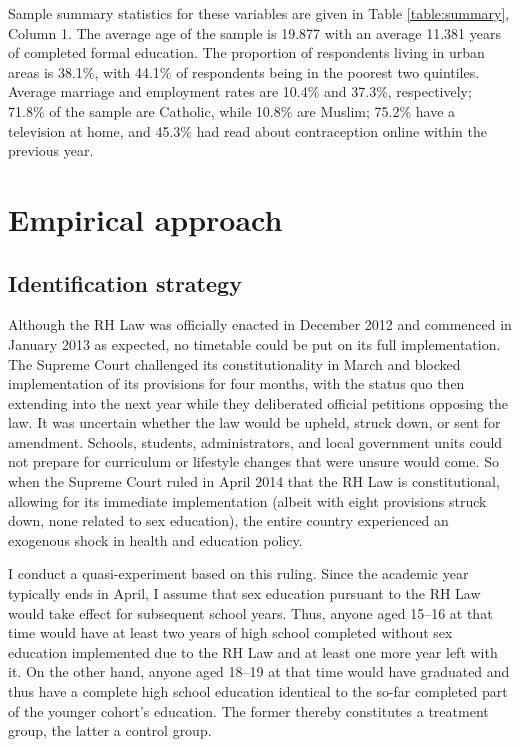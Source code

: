 \documentclass[12pt]{article}
\begin{document}
    Sample summary statistics for these variables are given in Table \ref{table:summary}, Column 1.
    The average age of the sample is 19.877 with an average 11.381 years of completed formal education.
    The proportion of respondents living in urban areas is 38.1\%, with 44.1\% of respondents being in the poorest two quintiles.
    Average marriage and employment rates are 10.4\% and 37.3\%, respectively; 71.8\% of the sample are Catholic, while 10.8\% are Muslim; 75.2\% have a television at home, and 45.3\% had read about contraception online within the previous year.


\section{Empirical approach}
    \subsection{Identification strategy}
    Although the RH Law was officially enacted in December 2012 and commenced in January 2013 as expected, no timetable could be put on its full implementation.
    The Supreme Court challenged its constitutionality in March and blocked implementation of its provisions for four months, with the status quo then extending into the next year while they deliberated official petitions opposing the law.
    It was uncertain whether the law would be upheld, struck down, or sent for amendment.
    Schools, students, administrators, and local government units could not prepare for curriculum or lifestyle changes that were unsure would come.
    So when the Supreme Court ruled in April 2014 that the RH Law is constitutional, allowing for its immediate implementation (albeit with eight provisions struck down, none related to sex education), the entire country experienced an exogenous shock in health and education policy.

    I conduct a quasi-experiment based on this ruling.
    Since the academic year typically ends in April, I assume that sex education pursuant to the RH Law would take effect for subsequent school years.
    Thus, anyone aged 15--16 at that time would have at least two years of high school completed without sex education implemented due to the RH Law and at least one more year left with it.
    On the other hand, anyone aged 18--19 at that time would have graduated and thus have a complete high school education identical to the so-far completed part of the younger cohort's education.
    The former thereby constitutes a treatment group, the latter a control group.
\end{document}
